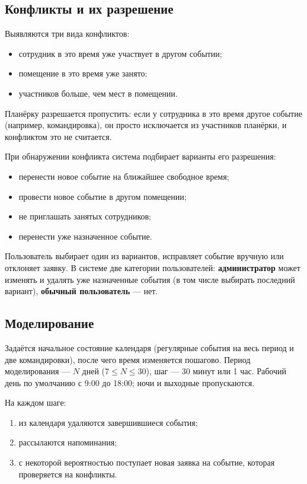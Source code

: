 \documentclass[12pt,a4paper]{article}
\begin{document}
\subsection*{Конфликты и их разрешение}
Выявляются три вида конфликтов:
\begin{itemize}
  \item сотрудник в это время уже участвует в другом событии;
  \item помещение в это время уже занято;
  \item участников больше, чем мест в помещении.
\end{itemize}
Планёрку разрешается пропустить: если у сотрудника в это время другое событие
(например, командировка), он просто исключается из участников планёрки,
и конфликтом это не считается.

При обнаружении конфликта система подбирает варианты его разрешения:
\begin{itemize}
  \item перенести новое событие на ближайшее свободное время;
  \item провести новое событие в другом помещении;
  \item не приглашать занятых сотрудников;
  \item перенести уже назначенное событие.
\end{itemize}
Пользователь выбирает один из вариантов, исправляет событие вручную или
отклоняет заявку. В системе две категории пользователей: \textbf{администратор}
может изменять и удалять уже назначенные события (в том числе выбирать последний
вариант), \textbf{обычный пользователь} --- нет.

\subsection*{Моделирование}
Задаётся начальное состояние календаря (регулярные события на весь период и две
командировки), после чего время изменяется пошагово. Период моделирования ---
$N$ дней ($7 \le N \le 30$), шаг --- 30 минут или 1 час. Рабочий день по умолчанию
с 9:00 до 18:00; ночи и выходные пропускаются.

На каждом шаге:
\begin{enumerate}
  \item из календаря удаляются завершившиеся события;
  \item рассылаются напоминания;
  \item с некоторой вероятностью поступает новая заявка на событие, которая
        проверяется на конфликты.
\end{enumerate}
\end{document}
